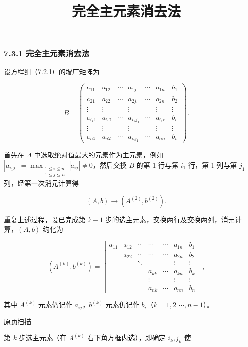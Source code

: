 \documentclass[
  10pt,
  fontset=fandol]{ctexart}
\title{完全主元素消去法}
\author{}
\date{}
\begin{document}
\maketitle

\subsubsection{7.3.1 完全主元素消去法}\label{ux5b8cux5168ux4e3bux5143ux7d20ux6d88ux53bbux6cd5}

设方程组（7.2.1）的增广矩阵为

\[
B=\left(\begin{array}{cccccc|c}
a_{11}&a_{12}&\cdots&a_{1j_1}&\cdots&a_{1n}&b_1\\
a_{21}&a_{22}&\cdots&a_{2j_1}&\cdots&a_{2n}&b_2\\
\vdots&\vdots&&\vdots&&\vdots&\vdots\\
a_{i_1 1}&a_{i_1 2}&\cdots&a_{i_1j_1}&\cdots&a_{i_1 n}&b_{i_1}\\
\vdots&\vdots&&\vdots&&\vdots&\vdots\\
a_{n1}&a_{n2}&\cdots&a_{nj_1}&\cdots&a_{nn}&b_n
\end{array}\right).
\]

首先在 \(A\) 中选取绝对值最大的元素作为主元素，例如 \(|a_{i_1j_1}|=\max_{\substack{1\le i\le n\\1\le j\le n}}|a_{ij}|\ne0\)，然后交换 \(B\) 的第 1 行与第 \(i_1\) 行，第 1 列与第 \(j_1\) 列，经第一次消元计算得

\[(A,b)\to(A^{(2)},b^{(2)}).\]

重复上述过程，设已完成第 \(k-1\) 步的选主元素，交换两行及交换两列，消元计算，\((A,b)\) 约化为

\[
(A^{(k)},b^{(k)})=\left[\begin{array}{cccccc|c}
a_{11}&a_{12}&\cdots&\cdots&\cdots&a_{1n}&b_1\\
&a_{22}&\cdots&\cdots&\cdots&a_{2n}&b_2\\
&&\ddots&&&\vdots&\vdots\\
&&&a_{kk}&\cdots&a_{kn}&b_k\\
&&&\vdots&&\vdots&\vdots\\
&&&a_{nk}&\cdots&a_{nn}&b_n
\end{array}\right],
\]

其中 \(A^{(k)}\) 元素仍记作 \(a_{ij}\)，\(b^{(k)}\) 元素仍记作 \(b_i\)（\(k=1,2,\cdots,n-1\)）。

\href{../../source-images/pdf-186.jpeg}{原页扫描}

第 \(k\) 步选主元素（在 \(A^{(k)}\) 右下角方框内选），即确定 \(i_k,j_k\) 使
\end{document}
